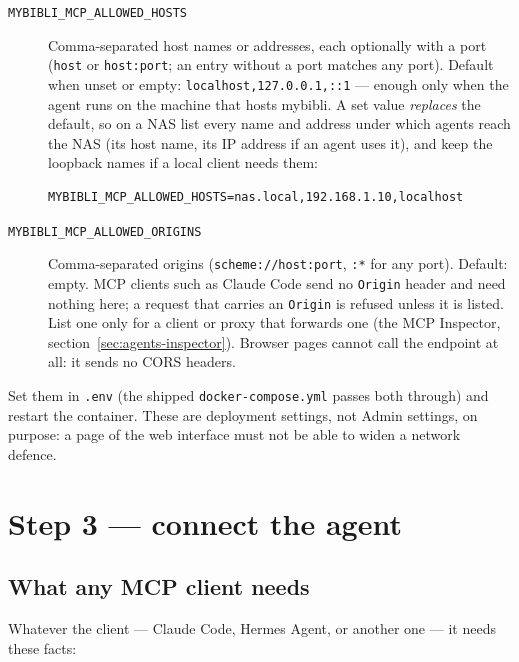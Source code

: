 \begin{description}
  \item[\texttt{MYBIBLI\_MCP\_ALLOWED\_HOSTS}]
        Comma-separated host names or addresses, each optionally with
        a port (\texttt{host} or \texttt{host:port}; an entry without
        a port matches any port). Default when unset or empty:
        \texttt{localhost,127.0.0.1,::1} --- enough only when the
        agent runs on the machine that hosts mybibli. A set value
        \emph{replaces} the default, so on a NAS list every name and
        address under which agents reach the NAS (its host name, its
        IP address if an agent uses it), and keep the loopback names
        if a local client needs them:
\begin{lstlisting}
MYBIBLI_MCP_ALLOWED_HOSTS=nas.local,192.168.1.10,localhost
\end{lstlisting}
  \item[\texttt{MYBIBLI\_MCP\_ALLOWED\_ORIGINS}]
        Comma-separated origins (\texttt{scheme://host:port},
        \texttt{:*} for any port). Default: empty. MCP clients such as
        Claude Code send no \texttt{Origin} header and need nothing
        here; a request that carries an \texttt{Origin} is refused
        unless it is listed. List one only for a client or proxy that
        forwards one (the MCP Inspector, section~\ref{sec:agents-inspector}).
        Browser pages cannot call the endpoint at all: it sends no
        CORS headers.
\end{description}

Set them in \texttt{.env} (the shipped \texttt{docker-compose.yml}
passes both through) and restart the container. These are deployment
settings, not Admin settings, on purpose: a page of the web interface
must not be able to widen a network defence.

\section{Step 3 --- connect the agent}
\label{sec:agents-connect}

\subsection{What any MCP client needs}
\label{sec:agents-connection-facts}

Whatever the client --- Claude Code, Hermes Agent, or another one ---
it needs these facts:

